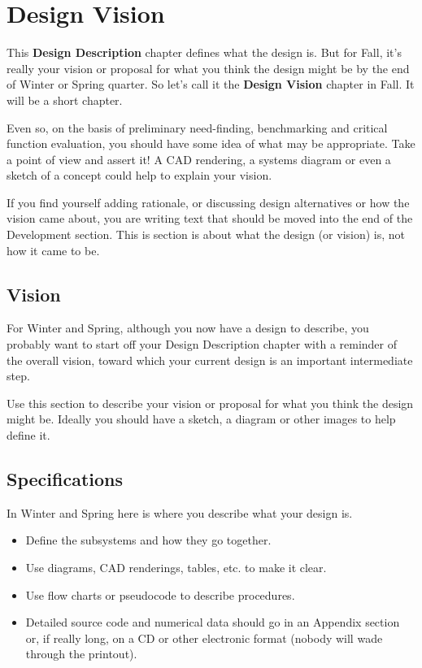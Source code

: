 \chapter{Design Vision}
\label{design-description}

This \textbf{Design Description} chapter defines what the design is. But for Fall, it's really your vision or proposal for what you think the design might be by the end of Winter or Spring quarter. So let's call it the \textbf{Design Vision} chapter in Fall. It will be a short
chapter. 

Even so, on the basis of preliminary need-finding, benchmarking and critical function evaluation, you should have some idea of what may be appropriate. Take a point of view and assert it!  A CAD rendering, a systems diagram or even a sketch of a concept could help to explain your vision. 

If you find yourself adding rationale, or discussing design alternatives or how the vision came about, you are writing text that should be moved into the end of the Development section. This is section is about what the design (or vision) 
is, not how it came to be.

\begin{remark}\color{blue}
\section{Vision}
\label{vision}

For Winter and Spring, although you now have a design to describe, you probably want to start off your Design Description chapter with a reminder of the overall vision, toward
which your current design is an important intermediate step.

Use this section to describe your vision or proposal for what you think the design might be. Ideally you should have a sketch, a diagram or other images to help define it.  
\section{Specifications}
\label{specifications}

In Winter and Spring here is where you describe what your design is. 
\begin{itemize}
\item Define the subsystems and how they go together.
\item Use diagrams, CAD renderings, tables, etc. to make it clear. 
\item Use flow charts or pseudocode to describe procedures.
\item Detailed source code and numerical data should go in an Appendix section or, if really long, on a CD or other electronic format (nobody will wade through the printout).
\end{itemize}

\normalcolor\end{remark}





